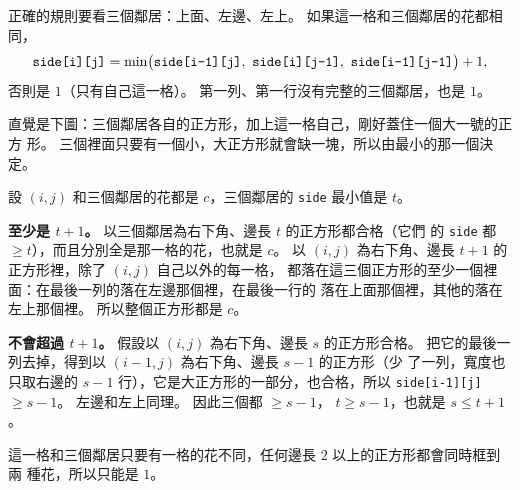 正確的規則要看三個鄰居：上面、左邊、左上。 如果這一格和三個鄰居的花都相同，
\[
\text{\texttt{side[i][j]}} = \min\bigl(\text{\texttt{side[i-1][j]}},\
\text{\texttt{side[i][j-1]}},\ \text{\texttt{side[i-1][j-1]}}\bigr) + 1,
\]
否則是 $1$（只有自己這一格）。 第一列、第一行沒有完整的三個鄰居，也是 $1$。

直覺是下圖：三個鄰居各自的正方形，加上這一格自己，剛好蓋住一個大一號的正方
形。 三個裡面只要有一個小，大正方形就會缺一塊，所以由最小的那一個決定。

\begin{center}
\label{fig:dp2-square}
\end{center}

\begin{whybox}[三個取最小值為什麼剛好]
設 $(i, j)$ 和三個鄰居的花都是 $c$，三個鄰居的 \texttt{side} 最小值是 $t$。

\textbf{至少是 $t + 1$。} 以三個鄰居為右下角、邊長 $t$ 的正方形都合格（它們
的 \texttt{side} 都 $\ge t$），而且分別全是那一格的花，也就是 $c$。 以
$(i, j)$ 為右下角、邊長 $t + 1$ 的正方形裡，除了 $(i, j)$ 自己以外的每一格，
都落在這三個正方形的至少一個裡面：在最後一列的落在左邊那個裡，在最後一行的
落在上面那個裡，其他的落在左上那個裡。 所以整個正方形都是 $c$。

\textbf{不會超過 $t + 1$。} 假設以 $(i, j)$ 為右下角、邊長 $s$ 的正方形合格。
把它的最後一列去掉，得到以 $(i - 1, j)$ 為右下角、邊長 $s - 1$ 的正方形（少
了一列，寬度也只取右邊的 $s - 1$ 行），它是大正方形的一部分，也合格，所以
\texttt{side[i-1][j]} $\ge s - 1$。 左邊和左上同理。 因此三個都 $\ge s - 1$，
$t \ge s - 1$，也就是 $s \le t + 1$。

這一格和三個鄰居只要有一格的花不同，任何邊長 $2$ 以上的正方形都會同時框到兩
種花，所以只能是 $1$。
\end{whybox}

